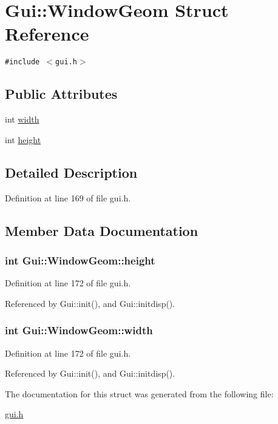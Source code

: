 \hypertarget{structGui_1_1WindowGeom}{
\section{Gui::WindowGeom Struct Reference}
\label{structGui_1_1WindowGeom}
}
{\tt \#include $<$gui.h$>$}

\subsection*{Public Attributes}
\begin{CompactItemize}
\item 
int \hyperlink{structGui_1_1WindowGeom_10914418e6394ae2979660cc335f4555}{width}
\item 
int \hyperlink{structGui_1_1WindowGeom_f68e86f3c5d2d877f7f5b2aa73888468}{height}
\end{CompactItemize}


\subsection{Detailed Description}


Definition at line 169 of file gui.h.

\subsection{Member Data Documentation}
\hypertarget{structGui_1_1WindowGeom_f68e86f3c5d2d877f7f5b2aa73888468}{
\subsubsection[{height}]{\setlength{\rightskip}{0pt plus 5cm}int {\bf Gui::WindowGeom::height}}}
\label{structGui_1_1WindowGeom_f68e86f3c5d2d877f7f5b2aa73888468}




Definition at line 172 of file gui.h.

Referenced by Gui::init(), and Gui::initdisp().\hypertarget{structGui_1_1WindowGeom_10914418e6394ae2979660cc335f4555}{
\subsubsection[{width}]{\setlength{\rightskip}{0pt plus 5cm}int {\bf Gui::WindowGeom::width}}}
\label{structGui_1_1WindowGeom_10914418e6394ae2979660cc335f4555}




Definition at line 172 of file gui.h.

Referenced by Gui::init(), and Gui::initdisp().

The documentation for this struct was generated from the following file:\begin{CompactItemize}
\item 
\hyperlink{gui_8h}{gui.h}\end{CompactItemize}
